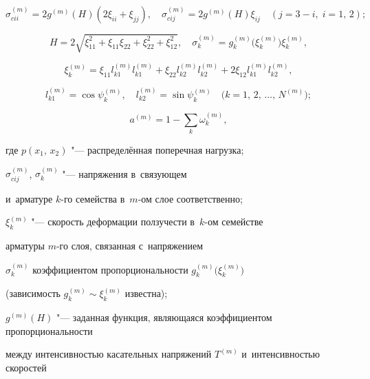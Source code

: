 $$

\sigma _{cii}^{(m)} = 2g^{(m)}\left( H \right)\left( {2\xi _{ii} + \xi_{jj} } \right), \quad 

\sigma _{cij}^{(m)} = 2g^{(m)}\left( H \right)\xi _{ij} \quad (j = 3 - i,\; i = 1,\,2); 

$$

$$

H = 2\sqrt {\xi _{11}^2 + \xi _{11} \xi _{22} + \xi _{22}^2 + \xi _{12}^2 } ,

\quad \sigma _k^{(m)} = g_k^{(m)} \bigl( \xi _k^{(m)}  \bigr)\xi 

_k^{(m)} ,

$$

\begin{equation}

\label{nemir:eq5}

\xi _k^{(m)} = \xi _{11} l_{k1}^{(m)} l_{k1}^{(m)} + \xi _{22} l_{k2}^{(m)} l_{k2}^{(m)} + 2\xi _{12} l_{k1}^{(m)} l_{k2}^{(m)},

\end{equation}

$$

l_{k1}^{(m)} = \cos \psi_k^{(m)} ,\quad 

l_{k2}^{(m)} = \sin \psi_k^{(m)} \quad 

\bigl(k = 1,\,2,\,\dots,\,N^{(m)}\bigr);

$$

$$

a^{(m)} = 1 - \sum\limits_k \omega _k^{(m)},

$$

где $p( x_1 ,\,x_2 )$ "--- распределённая поперечная нагрузка; 

$\sigma _{cij}^{(m)} $, $\sigma _k^{(m)} $ "--- напряжения в~связующем 

и~арматуре $k$-го семейства в~$m$-ом слое соответственно; 

$\xi _k^{(m)} $ "--- скорость деформации ползучести в~$k$-ом семействе 

арматуры $m$-го слоя, связанная с~напряжением 

$\sigma _k^{(m)} $ коэффициентом пропорциональности $g_k^{(m)}\! \bigl( \xi _k^{(m)} \bigr)$ 

(зависимость $g_k^{(m)} \sim \xi _k^{(m)}$ известна); 

$g^{(m)}( H )$ "--- заданная функция, являющаяся коэффициентом пропорциональности 

между интенсивностью касательных напряжений $T^{(m)}$ и~интенсивностью скоростей 

